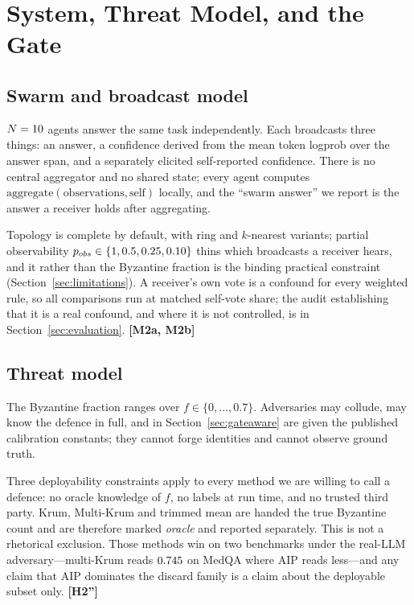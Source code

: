 \section{System, Threat Model, and the Gate}
\label{sec:system}

\subsection{Swarm and broadcast model}

$N = 10$ agents answer the same task independently. Each broadcasts three
things: an answer, a confidence derived from the mean token logprob over the
answer span, and a separately elicited self-reported confidence. There is no
central aggregator and no shared state; every agent computes
$\mathrm{aggregate}(\text{observations}, \text{self})$ locally, and the ``swarm
answer'' we report is the answer a receiver holds after aggregating.

Topology is complete by default, with ring and $k$-nearest variants; partial
observability $p_{obs} \in \{1, 0.5, 0.25, 0.10\}$ thins
which broadcasts a receiver hears, and it rather than the Byzantine fraction is
the binding practical constraint (Section~\ref{sec:limitations}). A receiver's
own vote is a confound for every weighted rule, so all comparisons run at matched
self-vote share; the audit establishing that it is a real confound, and where it
is not controlled, is in Section~\ref{sec:evaluation}. \textbf{[M2a, M2b]}

\subsection{Threat model}

The Byzantine fraction ranges over $f \in \{0, \ldots, 0.7\}$. Adversaries may
collude, may know the defence in full, and in Section~\ref{sec:gateaware} are
given the published calibration constants; they cannot forge identities and
cannot observe ground truth.

Three deployability constraints apply to every method we are willing to call a
defence: no oracle knowledge of $f$, no labels at run time, and no trusted third
party. Krum, Multi-Krum and trimmed mean are handed the true Byzantine count and
are therefore marked \emph{oracle} and reported separately. This is not a
rhetorical exclusion. Those methods win on two benchmarks under the real-LLM
adversary---multi-Krum reads $0.745$ on MedQA where AIP
reads less---and any claim that AIP dominates the discard family is a claim about
the deployable subset only. \textbf{[H2'']}

